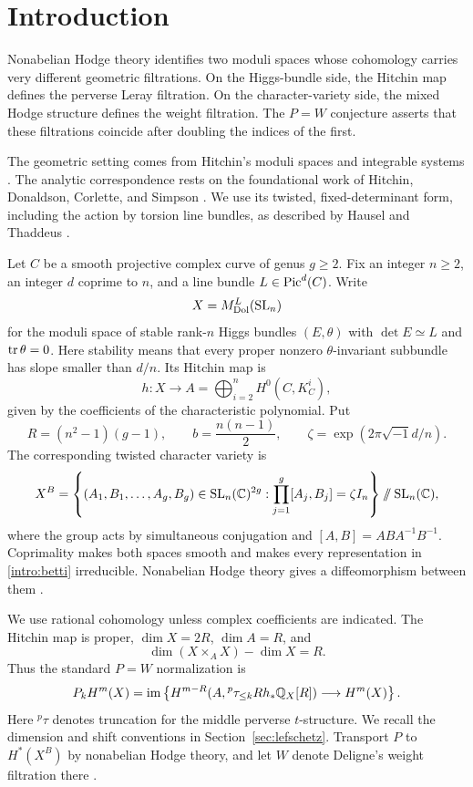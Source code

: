 \section{Introduction}

Nonabelian Hodge theory identifies two moduli spaces whose cohomology carries very different geometric filtrations. On the Higgs-bundle side, the Hitchin map defines the perverse Leray filtration. On the character-variety side, the mixed Hodge structure defines the weight filtration. The $P=W$ conjecture asserts that these filtrations coincide after doubling the indices of the first.

The geometric setting comes from Hitchin's moduli spaces and integrable systems \cite{Hitchin1987SelfDuality,Hitchin1987Integrable}. The analytic correspondence rests on the foundational work of Hitchin, Donaldson, Corlette, and Simpson \cite{Hitchin1987SelfDuality,Donaldson1987,Corlette1988,Simpson1992}. We use its twisted, fixed-determinant form, including the action by torsion line bundles, as described by Hausel and Thaddeus \cite[Sections~2 and~5]{HT2003}.

Let $C$ be a smooth projective complex curve of genus $g\ge2$. Fix an integer $n\ge2$, an integer $d$ coprime to $n$, and a line bundle $L\in\operatorname{Pic}^d(C)$. Write
\[
X=M_{\mathrm{Dol}}^L(\operatorname{SL}_n)
\]
for the moduli space of stable rank-$n$ Higgs bundles $(E,\theta)$ with $\det E\simeq L$ and $\operatorname{tr}\theta=0$. Here stability means that every proper nonzero $\theta$-invariant subbundle has slope smaller than $d/n$. Its Hitchin map is
\[
h:X\longrightarrow A=\bigoplus_{i=2}^nH^0(C,K_C^i),
\]
given by the coefficients of the characteristic polynomial. Put
\[
R=(n^2-1)(g-1),\qquad b=\frac{n(n-1)}2,
\qquad \zeta=\exp(2\pi\sqrt{-1}d/n).
\]
The corresponding twisted character variety is
\begin{equation}\label{intro:betti}
X^B=\left\{(A_1,B_1,\ldots,A_g,B_g)\in\operatorname{SL}_n(\mathbb C)^{2g}:
\prod_{j=1}^g[A_j,B_j]=\zeta I_n\right\}\mathbin{/\mkern-6mu/}\operatorname{SL}_n(\mathbb C),
\end{equation}
where the group acts by simultaneous conjugation and $[A,B]=ABA^{-1}B^{-1}$. Coprimality makes both spaces smooth and makes every representation in \eqref{intro:betti} irreducible. Nonabelian Hodge theory gives a diffeomorphism between them \cite{HT2003,Simpson1997}.

We use rational cohomology unless complex coefficients are indicated. The Hitchin map is proper, $\dim X=2R$, $\dim A=R$, and
\[
\dim(X\times_A X)-\dim X=R.
\]
Thus the standard $P=W$ normalization is
\begin{equation}\label{intro:P}
P_kH^m(X)=\operatorname{im}\left\{
H^{m-R}\!\left(A,{}^p\tau_{\le k}Rh_*\mathbb Q_X[R]\right)
\longrightarrow H^m(X)\right\}.
\end{equation}
Here ${}^p\tau$ denotes truncation for the middle perverse $t$-structure. We recall the dimension and shift conventions in Section~\ref{sec:lefschetz}. Transport $P$ to $H^*(X^B)$ by nonabelian Hodge theory, and let $W$ denote Deligne's weight filtration there \cite{Deligne1971,Deligne1974}.

